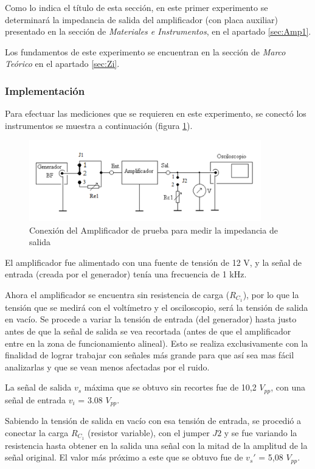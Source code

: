 
Como lo indica el título de esta sección, en este primer experimento se determinará la impedancia de salida del amplificador (con placa auxiliar) presentado en la sección de \textit{Materiales e Instrumentos}, en el apartado \ref{sec:Amp1}. 

Los fundamentos de este experimento se encuentran en la sección de \textit{Marco Teórico} en el apartado \ref{sec:Zi}.

\subsubsection{Implementación}

Para efectuar las mediciones que se requieren en este experimento, se conectó los instrumentos se muestra a continuación (figura \ref{fig:conexZoLA}).

\begin{figure}[H]
    \centering
    \includegraphics[width=0.9\textwidth]{Imagenes/conexZoLA.png}
    \caption{Conexión del Amplificador de prueba para medir la impedancia de salida}
    \label{fig:conexZoLA}
\end{figure}

El amplificador fue alimentado con una fuente de tensión de 12 V, y la señal de entrada (creada por el generador) tenía una frecuencia de 1 kHz.

Ahora el amplificador se encuentra sin resistencia de carga ($R_{C_1}$), por lo que la tensión que se medirá con el voltímetro y el osciloscopio, será la tensión de salida en vacío. Se procede a variar la tensión de entrada (del generador) hasta justo antes de que la señal de salida se vea recortada (antes de que el amplificador entre en la zona de funcionamiento alineal). Esto se realiza exclusivamente con la finalidad de lograr trabajar con señales más grande para que así sea mas fácil analizarlas y que se vean menos afectadas por el ruido.

La señal de salida $v_s$ máxima que se obtuvo sin recortes fue de 10,2 $V_{pp}$, con una señal de entrada $v_i$ = 3.08 $V_{pp}$.

Sabiendo la tensión de salida en vacío con esa tensión de entrada, se procedió a conectar la carga $R_{C_1}$ (resistor variable), con el jumper $J2$ y se fue variando la resistencia hasta obtener en la salida una señal con la mitad de la amplitud de la señal original. El valor más próximo a este que se obtuvo fue de $v_s'$ = 5,08 $V_{pp}$.

